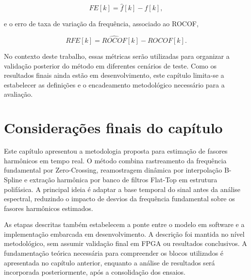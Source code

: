 \begin{equation}
FE[k] = \hat{f}[k] - f[k],
\label{eq:erro_frequencia}
\end{equation}

\noindent e o erro de taxa de variação da frequência, associado ao ROCOF,

\begin{equation}
RFE[k] = \widehat{ROCOF}[k] - ROCOF[k].
\label{eq:erro_rocof}
\end{equation}

No contexto deste trabalho, essas métricas serão utilizadas para organizar a validação posterior do método em diferentes cenários de teste. Como os resultados finais ainda estão em desenvolvimento, este capítulo limita-se a estabelecer as definições e o encadeamento metodológico necessário para a avaliação.

\section{Considerações finais do capítulo}

Este capítulo apresentou a metodologia proposta para estimação de fasores harmônicos em tempo real. O método combina rastreamento da frequência fundamental por Zero-Crossing, reamostragem dinâmica por interpolação B-Spline e extração harmônica por banco de filtros Flat-Top em estrutura polifásica. A principal ideia é adaptar a base temporal do sinal antes da análise espectral, reduzindo o impacto de desvios da frequência fundamental sobre os fasores harmônicos estimados.

As etapas descritas também estabelecem a ponte entre o modelo em software e a implementação embarcada em desenvolvimento. A descrição foi mantida no nível metodológico, sem assumir validação final em FPGA ou resultados conclusivos. A fundamentação teórica necessária para compreender os blocos utilizados é apresentada no capítulo anterior, enquanto a análise de resultados será incorporada posteriormente, após a consolidação dos ensaios.
